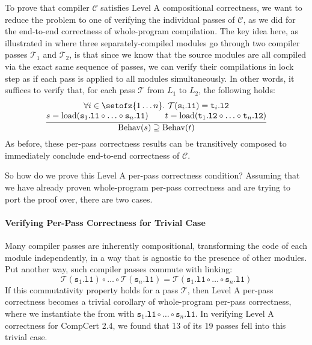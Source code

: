 To prove that compiler $\mathcal{C}$ satisfies Level A compositional correctness, we want to reduce
the problem to one of verifying the individual passes of $\mathcal{C}$, as we did for the end-to-end
correctness of whole-program compilation.  The key idea here, as illustrated in
 where three separately-compiled modules go through two compiler passes
$\mathcal{T}_1$ and $\mathcal{T}_2$, is that since we know that the source modules are all compiled
via the exact same sequence of passes, we can verify their compilations in lock step as if each pass
is applied to all modules simultaneously.  In other words, it suffices to verify that, for each pass
$\mathcal{T}$ from $L_1$ to $L_2$, the following holds:
\[
\frac{
\begin{array}{@{}c@{}}
\forall i\in\setofz{1\ldots n}.~\mathcal{T}(\mathtt{s}_i\mathtt{.l1}) = \mathtt{t}_i\mathtt{.l2} \\
s = \mathrm{load}(\mathtt{s}_1\mathtt{.l1}\circ \ldots \circ \mathtt{s}_n\mathtt{.l1})\qquad
t = \mathrm{load}(\mathtt{t}_1\mathtt{.l2}\circ \ldots \circ \mathtt{t}_n\mathtt{.l2})
\end{array}
}
{
\mathrm{Behav}(s) 
\supseteq \mathrm{Behav}(t)
}
\]
As before, these per-pass correctness results can be transitively
composed to immediately conclude end-to-end correctness of
$\mathcal{C}$.

So how do we prove this Level A per-pass correctness condition?  Assuming that we have already
proven whole-program per-pass correctness and are trying to port the proof over, there are two
cases.

\paragraph{Verifying Per-Pass Correctness for Trivial Case}

Many compiler passes are inherently
compositional, transforming the code of each module independently, \ie
in a way that is agnostic to the presence of other modules.  Put
another way, such compiler passes commute with linking:
\[
\mathcal{T}(\mathtt{s}_1\mathtt{.l1})\circ \ldots \circ \mathcal{T}(\mathtt{s}_n\mathtt{.l1}) = \mathcal{T}(\mathtt{s}_1\mathtt{.l1}\circ \ldots \circ \mathtt{s}_n\mathtt{.l1})
\]
If this commutativity property holds for a pass $\mathcal{T}$, then Level A per-pass correctness
becomes a trivial corollary of whole-program per-pass correctness, where we instantiate the
 from  with
$\mathtt{s}_1\mathtt{.l1}\circ \ldots \circ \mathtt{s}_n\mathtt{.l1}$.  In verifying Level A
correctness for CompCert 2.4, we found that 13 of its 19 passes fell into this trivial case.

